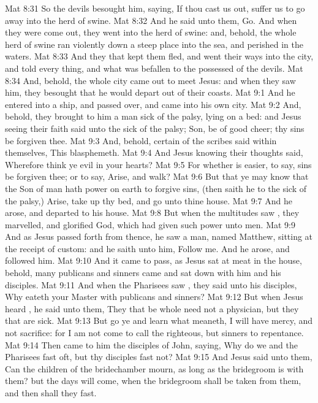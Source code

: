 \vs Mat 8:31 So the devils besought him, saying, If thou cast us out, suffer us to go away into the herd of swine.
\vs Mat 8:32 And he said unto them, Go. And when they were come out, they went into the herd of swine: and, behold, the whole herd of swine ran violently down a steep place into the sea, and perished in the waters.
\vs Mat 8:33 And they that kept them fled, and went their ways into the city, and told every thing, and what was befallen to the possessed of the devils.
\vs Mat 8:34 And, behold, the whole city came out to meet Jesus: and when they saw him, they besought  that he would depart out of their coasts.
\vs Mat 9:1 And he entered into a ship, and passed over, and came into his own city.
\vs Mat 9:2 And, behold, they brought to him a man sick of the palsy, lying on a bed: and Jesus seeing their faith said unto the sick of the palsy; Son, be of good cheer; thy sins be forgiven thee.
\vs Mat 9:3 And, behold, certain of the scribes said within themselves, This  blasphemeth.
\vs Mat 9:4 And Jesus knowing their thoughts said, Wherefore think ye evil in your hearts?
\vs Mat 9:5 For whether is easier, to say,  sins be forgiven thee; or to say, Arise, and walk?
\vs Mat 9:6 But that ye may know that the Son of man hath power on earth to forgive sins, (then saith he to the sick of the palsy,) Arise, take up thy bed, and go unto thine house.
\vs Mat 9:7 And he arose, and departed to his house.
\vs Mat 9:8 But when the multitudes saw , they marvelled, and glorified God, which had given such power unto men.
\vs Mat 9:9 And as Jesus passed forth from thence, he saw a man, named Matthew, sitting at the receipt of custom: and he saith unto him, Follow me. And he arose, and followed him.
\vs Mat 9:10 And it came to pass, as Jesus sat at meat in the house, behold, many publicans and sinners came and sat down with him and his disciples.
\vs Mat 9:11 And when the Pharisees saw , they said unto his disciples, Why eateth your Master with publicans and sinners?
\vs Mat 9:12 But when Jesus heard , he said unto them, They that be whole need not a physician, but they that are sick.
\vs Mat 9:13 But go ye and learn what  meaneth, I will have mercy, and not sacrifice: for I am not come to call the righteous, but sinners to repentance.
\vs Mat 9:14 Then came to him the disciples of John, saying, Why do we and the Pharisees fast oft, but thy disciples fast not?
\vs Mat 9:15 And Jesus said unto them, Can the children of the bridechamber mourn, as long as the bridegroom is with them? but the days will come, when the bridegroom shall be taken from them, and then shall they fast.
